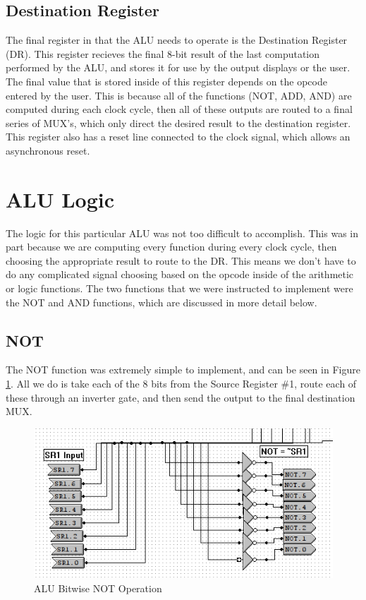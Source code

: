 \documentclass[a4paper,11pt]{article}
\begin{document}
\subsection{Destination Register}

The final register in that the ALU needs to operate is the Destination Register (DR). This register recieves the final 8-bit result of the last computation performed by the ALU, and stores it for use by the output displays or the user. The final value that is stored inside of this register depends on the opcode entered by the user. This is because all of the functions (NOT, ADD, AND) are computed during each clock cycle, then all of these outputs are routed to a final series of MUX's, which only direct the desired result to the destination register. This register also has a reset line connected to the clock signal, which allows an asynchronous reset.

\section{ALU Logic}
The logic for this particular ALU was not too difficult to accomplish. This was in part because we are computing every function during every clock cycle, then choosing the appropriate result to route to the DR. This means we don't have to do any complicated signal choosing based on the opcode inside of the arithmetic or logic functions. The two functions that we were instructed to implement were the NOT and AND functions, which are discussed in more detail below.

\subsection{NOT}
The NOT function was extremely simple to implement, and can be seen in Figure \ref{fig:notfunction}. All we do is take each of the 8 bits from the Source Register \#1, route each of these through an inverter gate, and then send the output to the final destination MUX. 

  \begin{figure}[h!]
     \centering
       \includegraphics[width=4.7in]{pictures/notfunction}
     \caption{ALU Bitwise NOT Operation}
     \label{fig:notfunction}
  \end{figure} 
\end{document}
